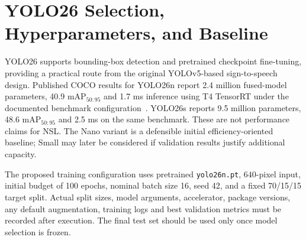 \documentclass[conference]{IEEEtran}
\begin{document}
\section{YOLO26 Selection, Hyperparameters, and Baseline}
YOLO26 supports bounding-box detection and pretrained checkpoint fine-tuning, providing a practical route from the original YOLOv5-based sign-to-speech design. Published COCO results for YOLO26n report 2.4 million fused-model parameters, 40.9 mAP$_{50:95}$ and 1.7 ms inference using T4 TensorRT under the documented benchmark configuration~\cite{yolo26}. YOLO26s reports 9.5 million parameters, 48.6 mAP$_{50:95}$ and 2.5 ms on the same benchmark. These are not performance claims for NSL. The Nano variant is a defensible initial efficiency-oriented baseline; Small may later be considered if validation results justify additional capacity.
\par The proposed training configuration uses pretrained \texttt{yolo26n.pt}, $640$-pixel input, initial budget of 100 epochs, nominal batch size 16, seed 42, and a fixed 70/15/15 target split. Actual split sizes, model arguments, accelerator, package versions, any default augmentation, training logs and best validation metrics must be recorded after execution. The final test set should be used only once model selection is frozen.
\end{document}
